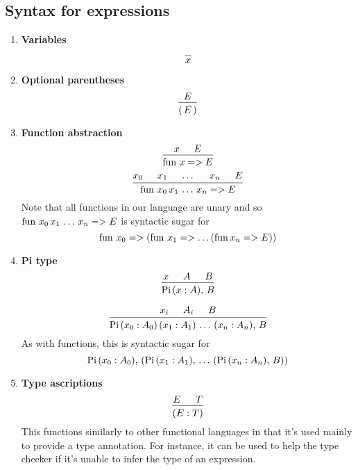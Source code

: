 \documentclass{article}
\begin{document}
\subsection{Syntax for expressions}
\begin{enumerate}
\item \textbf{Variables} \\
  \[
    \begin{prooftree}
      \infer0{x}
    \end{prooftree}
  \]

\item \textbf{Optional parentheses} \\
  \[
    \begin{prooftree}
      \hypo{E}
      \infer1{( \, E \, )}
    \end{prooftree}
  \]
  
\item \textbf{Function abstraction} \\
  \[
    \begin{prooftree}
      \hypo{x}
      \hypo{E}
      \infer2{\fun \, x => E}
    \end{prooftree}
  \]
  \[
    \begin{prooftree}
      \hypo{x_0}
      \hypo{x_1}
      \hypo{\dots}
      \hypo{x_n}
      \hypo{E}
      \infer5{\fun \, x_0 \, x_1 \, \dots \, x_n => E}
    \end{prooftree}
  \]
  Note that all functions in our language are unary and so
  $\operatorname{fun} \, x_0 \, x_1 \, \dots \, x_n => E$ is syntactic sugar for
  \[ \operatorname{fun} \, x_0 => (\operatorname{fun} \, x_1 => \dots (\operatorname{fun} x_n => E)) \]

\item \textbf{Pi type} \\
  \[
    \begin{prooftree}
      \hypo{x}
      \hypo{A}
      \hypo{B}
      \infer3{\Pii \, (x : A), \, B}
    \end{prooftree}
  \] 

  \[
    \begin{prooftree}
      \hypo{x_i}
      \hypo{A_i}
      \hypo{B}
      \infer3{\Pii \, (x_0 : A_0) \, (x_1 : A_1) \, \dots \, (x_n : A_n), \, B}
    \end{prooftree}
  \] 
  As with functions, this is syntactic sugar for
  \[ \operatorname{Pi} \, (x_0 : A_0), \, (\operatorname{Pi} \, (x_1 : A_1), \,  \dots \, (\operatorname{Pi} \, (x_n : A_n), \, B)) \]

\item \textbf{Type ascriptions} \\
  \[
    \begin{prooftree}
      \hypo{E}
      \hypo{T}
      \infer2{(E : T)}
    \end{prooftree}
  \]
  This functions similarly to other functional languages in that it's used
  mainly to provide a type annotation. For instance, it can be used to help the
  type checker if it's unable to infer the type of an expression.
\end{enumerate}
\end{document}
